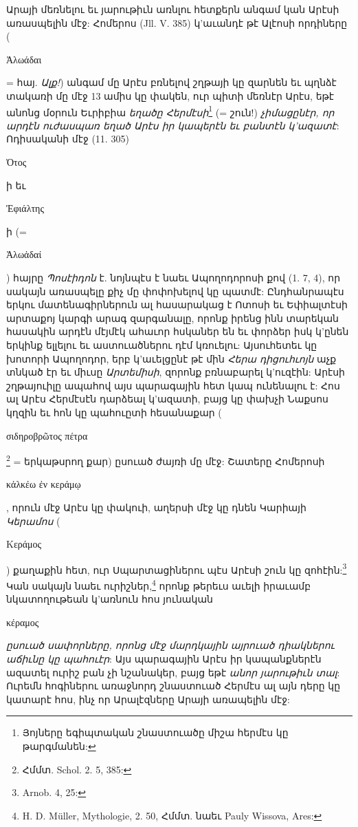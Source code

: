 \documentclass{article}
\begin{document}
{Արայի մեռնելու եւ յարութիւն առնլու հետքերն անգամ կան Արէսի առասպելին մէջ: Հոմերոս (Jll. V. 385) կ'աւանդէ թէ Ալէոսի որդիները (\begin{greek}Ἀλωάδαι\end{greek} = հայ. \emph{Ալք!}) անգամ մը Արէս բռնելով շղթայի կը զարնեն եւ պղնձէ տակառի մը մէջ 13 ամիս կը փակեն, ուր պիտի մեռնէր Արէս, եթէ անոնց մօրուն Եւրիբիա \emph{եղածը Հերմէսի}\footnote{Յոյները եգիպտական շնաստուածը միշա հերմէս կը թարգմանեն:} (= շուն!) \emph{չիմացընէր, որ արդէն ուժասպառ եղած Արէս իր կապերէն եւ բանտէն կ'ազատէ}: Ոդիսականի մէջ (11. 305) \begin{greek}Ὀτος\end{greek}ի եւ \begin{greek}Ἐφιάλτης\end{greek}ի (= \begin{greek}Ἀλωἁδαί\end{greek}) հայրը \emph{Պոսէիդոն} է. նոյնպէս է նաեւ Ապողոդորոսի քով (1. 7, 4), որ սակայն առասպելը քիչ մը փոփոխելով կը պատմէ: Ընդհանրապէս երկու մատենագիրներուն ալ հասարակաց է Ոտոսի եւ Եփիալտէսի արտաքոյ կարգի արագ զարգանալը, որոնք իրենց ինն տարեկան հասակին արդէն մէյմէկ ահաւոր հսկաներ են եւ փորձեր իսկ կ'ընեն երկինք ելլելու եւ աստուածներու դէմ կռուելու: Այսուհետեւ կը խոտորի Ապողոդոր, երբ կ'աւելցընէ թէ մին \emph{Հերա դիցուհւոյն} աչք տնկած էր եւ միւսը \emph{Արտեմիսի}, զորոնք բռնաբարել կ'ուզէին: Արէսի շղթայուիլը ապահով այս պարագային հետ կապ ունենալու է: Հոս ալ Արէս Հերմէսէն դարձեալ կ'ազատի, բայց կը փախչի Նաքսոս կղզին եւ հոն կը պահուըտի հեսանաքար (\begin{greek}σιδηροβρῶτος πέτρα\end{greek}\footnote{Հմմտ. Schol. 2. 5, 385:} = երկաթսրող քար) ըսուած ժայռի մը մէջ: Շատերը Հոմերոսի \begin{greek}κἀλκέω ἐν κεράμῳ\end{greek}, որուն մէջ Արէս կը փակուի, աղերսի մէջ կը դնեն Կարիայի \emph{Կերամոս} (\begin{greek}Κεράμος\end{greek}) քաղաքին հետ, ուր Սպարտացիներու պէս Արէսի շուն կը զոհէին:\footnote{Arnob. 4, 25:} Կան սակայն նաեւ ուրիշներ,\footnote{H. D. Müller, Mythologie, 2. 50, Հմմտ. նաեւ Pauly Wissova, Ares:} որոնք թերեւս աւելի իրաւամբ նկատողութեան կ'առնուն հոս յունական \begin{greek}κέραμος\end{greek} \emph{ըսուած սափորները, որոնց մէջ մարդկային այրուած դիակներու աճիւնը կը պահուէր}: Այս պարագային Արէս իր կապանքներէն ազատել ուրիշ բան չի նշանակեր, բայց եթէ \emph{անոր յարութիւն տալ}: Ուրեմն հոգիներու առաջնորդ շնաստուած Հերմէս ալ այն դերը կը կատարէ հոս, ինչ որ Արալէզները Արայի առապելին մէջ:

}
\end{document}
